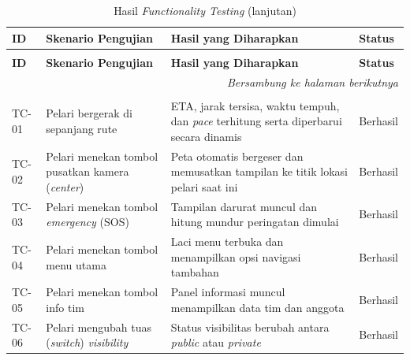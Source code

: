 \begin{longtable}{|p{1.2cm}|p{4.5cm}|p{5cm}|p{2cm}|}
\caption{Hasil \textit{Functionality Testing}} \label{tab:functionality-testing} \\

\hline
\textbf{ID} & \textbf{Skenario Pengujian} & \textbf{Hasil yang Diharapkan} & \textbf{Status} \\ \hline
\endfirsthead

\caption[]{Hasil \textit{Functionality Testing} (lanjutan)} \\
\hline
\textbf{ID} & \textbf{Skenario Pengujian} & \textbf{Hasil yang Diharapkan} & \textbf{Status} \\ \hline
\endhead

\hline
\multicolumn{4}{r}{\textit{Bersambung ke halaman berikutnya}} \\
\endfoot

\hline
\endlastfoot

\multicolumn{4}{|c|}{\textbf{Mobile (Pelari)}} \\ \hline

TC-01 & Pelari bergerak di sepanjang rute & ETA, jarak tersisa, waktu tempuh, dan \textit{pace} terhitung serta diperbarui secara dinamis & Berhasil \\ \hline

TC-02 & Pelari menekan tombol pusatkan kamera (\textit{center}) & Peta otomatis bergeser dan memusatkan tampilan ke titik lokasi pelari saat ini & Berhasil \\ \hline

TC-03 & Pelari menekan tombol \textit{emergency} (SOS) & Tampilan darurat muncul dan hitung mundur peringatan dimulai & Berhasil \\ \hline

TC-04 & Pelari menekan tombol menu utama & Laci menu terbuka dan menampilkan opsi navigasi tambahan & Berhasil \\ \hline

TC-05 & Pelari menekan tombol info tim & Panel informasi muncul menampilkan data tim dan anggota & Berhasil \\ \hline

TC-06 & Pelari mengubah tuas (\textit{switch}) \textit{visibility} & Status visibilitas berubah antara \textit{public} atau \textit{private} & Berhasil \\ \hline


\end{longtable}
